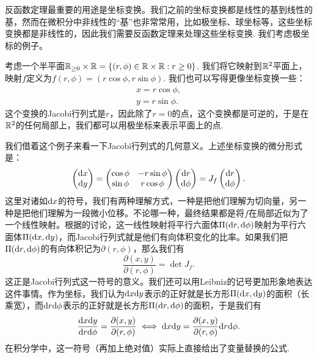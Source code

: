 反函数定理最重要的用途是坐标变换。我们之前的坐标变换都是线性的基到线性的基，然而在微积分中非线性的“基”也非常常用，比如极坐标、球坐标等，这些坐标变换都是非线性的，因此我们需要反函数定理来处理这些坐标变换. 我们考虑极坐标的例子。

\begin{example}[极坐标]\label{ex:polar-coordinates}
    考虑一个半平面$\mathbb{R}_{\geq 0}\times\mathbb{R}=\{(r,\phi)\in\mathbb{R}\times\mathbb{R}:r\geq 0\}$. 我们将它映射到$\mathbb{R}^2$平面上，映射$f$定义为$f(r,\phi)=(r\cos\phi,r\sin\phi)$. 我们也可以写得更像坐标变换一些：
    \begin{gather*}
        x=r\cos\phi, \\
        y=r\sin\phi.
    \end{gather*}
    这个变换的Jacobi行列式是$r$，因此除了$r=0$的点，这个变换都是可逆的，于是在$\mathbb{R}^2$的任何局部上，我们都可以用极坐标来表示平面上的点.

    我们借着这个例子来看一下Jacobi行列式的几何意义。上述坐标变换的微分形式是：
    \[\begin{pmatrix}
        \mathrm{d} x \\
        \mathrm{d} y
    \end{pmatrix}=\begin{pmatrix}
        \cos\phi & -r\sin\phi \\
        \sin\phi & r\cos\phi
    \end{pmatrix}\begin{pmatrix}
        \mathrm{d} r \\
        \mathrm{d}\phi
    \end{pmatrix}=J_f \begin{pmatrix}
        \mathrm{d} r \\
        \mathrm{d}\phi
    \end{pmatrix}.\]
    这里对诸如$\mathrm{d} x$的符号，我们有两种理解方式，一种是把他们理解为切向量，另一种是把他们理解为一段微小位移。不论哪一种，最终结果都是将$f$在局部近似为了一个线性映射。根据的讨论，这一线性映射将平行六面体$\Pi(\mathrm{d} r,\mathrm{d} \phi)$映射为平行六面体$\Pi(\mathrm{d} x,\mathrm{d} y)$，而Jacobi行列式就是他们有向体积变化的比率。如果我们把$\Pi(\mathrm{d} r,\mathrm{d} \phi)$的有向体积记为$\partial(r,\phi)$，那么我们有
    \[\frac{\partial(x,y)}{\partial(r,\phi)}=\det J_f.\]
    这正是Jacobi行列式这一符号的意义。我们还可以用Leibniz的记号更加形象地表达这件事情。作为坐标，我们认为$\mathrm{d} x\mathrm{d} y$表示的正好就是长方形$\Pi(\mathrm{d} x,\mathrm{d} y)$的面积（长乘宽），而$\mathrm{d} r\mathrm{d}\phi$表示的正好就是长方形$\Pi(\mathrm{d} r,\mathrm{d} \phi)$的面积，于是我们有
    \[\frac{\mathrm{d} x\mathrm{d} y}{\mathrm{d} r\mathrm{d}\phi}=\frac{\partial(x,y)}{\partial(r,\phi)}\iff \mathrm{d} x \mathrm{d} y= \frac{\partial(x,y)}{\partial(r,\phi)}\mathrm{d} r\mathrm{d}\phi.\]
    在积分学中，这一符号（再加上绝对值）实际上直接给出了变量替换的公式.
\end{example}